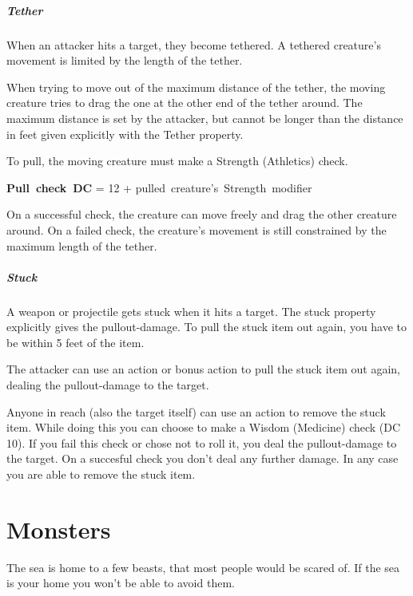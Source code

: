 \documentclass[letterpaper,twocolumn,openany,nodeprecatedcode]{dndbook}
\begin{document}
\subparagraph{Tether}
When an attacker hits a target, they become tethered.
A tethered creature's movement is limited by the length of the tether.

When trying to move out of the maximum distance of the tether, the moving creature tries to drag the one at the other end of the tether around.
The maximum distance is set by the attacker, but cannot be longer than the distance in feet given explicitly with the Tether property.

To pull, the moving creature must make a Strength (Athletics) check.

\begin{center}
    \mbox{\bf Pull check DC} = \mbox{12} + \mbox{pulled creature's Strength modifier}
\end{center}

On a successful check, the creature can move freely and drag the other creature around.
On a failed check, the creature's movement is still constrained by the maximum length of the tether.

\subparagraph{Stuck}
A weapon or projectile gets stuck when it hits a target.
The stuck property explicitly gives the pullout-damage.
To pull the stuck item out again, you have to be within 5 feet of the item.

The attacker can use an action or bonus action to pull the stuck item out again, dealing the pullout-damage to the target.

Anyone in reach (also the target itself) can use an action to remove the stuck item.
While doing this you can choose to make a Wisdom (Medicine) check (DC 10).
If you fail this check or chose not to roll it, you deal the pullout-damage to the target.
On a succesful check you don't deal any further damage.
In any case you are able to remove the stuck item.

\section{Monsters}
The sea is home to a few beasts, that most people would be scared of.
If the sea is your home you won't be able to avoid them.
\end{document}
